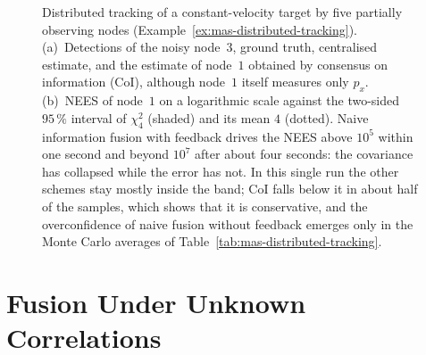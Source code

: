 \documentclass[graybox,envcountchap]{style/SNmono}
\begin{document}
\begin{figure}[!t]
{
}
\caption{Distributed tracking of a constant-velocity target by five partially observing nodes (Example~\ref{ex:mas-distributed-tracking}). (a)~Detections of the noisy node~$3$, ground truth, centralised estimate, and the estimate of node~$1$ obtained by consensus on information (CoI), although node~$1$ itself measures only $p_x$. (b)~NEES of node~$1$ on a logarithmic scale against the two-sided $95\,\%$ interval of $\chi^{2}_{4}$ (shaded) and its mean $4$ (dotted). Naive information fusion with feedback drives the NEES above $10^{5}$ within one second and beyond $10^{7}$ after about four seconds: the covariance has collapsed while the error has not. In this single run the other schemes stay mostly inside the band; CoI falls below it in about half of the samples, which shows that it is conservative, and the overconfidence of naive fusion without feedback emerges only in the Monte Carlo averages of Table~\ref{tab:mas-distributed-tracking}.}
\label{fig:mas-distributed-tracking}
\end{figure}

\section{Fusion Under Unknown Correlations}
\label{sec:mas-unknown-corr}
\end{document}
